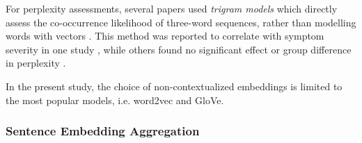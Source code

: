 For perplexity assessments, several papers used \textit{trigram	models} which directly assess the co-occurrence likelihood of three-word sequences, rather than modelling words with vectors \citep{mitchell2015quantifying, vail2018toward, girard2022computational}. This method was reported to correlate with symptom severity in one study \citep{vail2018toward}, while others found no significant effect \citep{girard2022computational} or group difference in perplexity \citep{mitchell2015quantifying}.

In the present study, the choice of non-contextualized embeddings is limited to the most popular models, i.e. word2vec and GloVe. 

\subsubsection{Sentence Embedding Aggregation}

